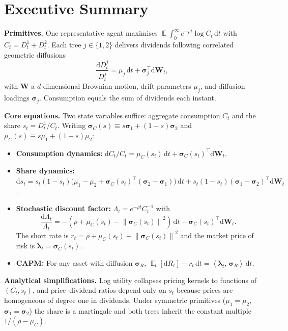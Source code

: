 ﻿\documentclass[11pt,letterpaper,oneside]{article}
\numberwithin{equation}{section}
\DeclareMathOperator{\E}{\mathbb{E}}
\newcommand{\1}{\mathbf{1}}
\newcommand{\diff}{\mathrm{d}}
\newcommand{\norm}[1]{\left\lVert #1\right\rVert}
\newcommand{\ip}[2]{\left\langle #1,\,#2\right\rangle}
\begin{document}
\section*{Executive Summary }
\begin{tcolorbox}[didacticstyle]
\textbf{Primitives.}
One representative agent maximises $\E\!\int_0^\infty e^{-\rho t}\log C_t\,\diff t$ with $C_t=D^1_t+D^2_t$. Each tree $j\in\{1,2\}$ delivers dividends following correlated geometric diffusions
\[
  \frac{\diff D^j_t}{D^j_t}=\mu_j\,\diff t+\bm{\sigma}_j^{\top}\diff \bm{W}_t,
\]
with $\bm{W}$ a $d$-dimensional Brownian motion, drift parameters $\mu_j$, and diffusion loadings $\bm{\sigma}_j$. Consumption equals the sum of dividends each instant.

\textbf{Core equations.} Two state variables suffice: aggregate consumption $C_t$ and the share $s_t=D^1_t/C_t$. Writing $\bm{\sigma}_C(s)\equiv s\bm{\sigma}_1+(1-s)\bm{\sigma}_2$ and $\mu_C(s)\equiv s\mu_1+(1-s)\mu_2$:
\begin{itemize}[leftmargin=1.25em]
  \item \textbf{Consumption dynamics:} $\diff C_t/C_t = \mu_C(s_t)\,\diff t + \bm{\sigma}_C(s_t)^{\top}\diff\bm{W}_t$.
  \item \textbf{Share dynamics:} $\diff s_t = s_t(1-s_t)\big(\mu_1-\mu_2+\bm{\sigma}_C(s_t)^{\top}(\bm{\sigma}_2-\bm{\sigma}_1)\big)\,\diff t + s_t(1-s_t)(\bm{\sigma}_1-\bm{\sigma}_2)^{\top}\diff\bm{W}_t$.
  \item \textbf{Stochastic discount factor:} $\Lambda_t=e^{-\rho t}C_t^{-1}$ with
  \[
    \frac{\diff \Lambda_t}{\Lambda_t}=-(\rho+\mu_C(s_t)-\norm{\bm{\sigma}_C(s_t)}^2)\,\diff t - \bm{\sigma}_C(s_t)^{\top}\diff \bm{W}_t.
  \]
  The short rate is $r_t=\rho+\mu_C(s_t)-\norm{\bm{\sigma}_C(s_t)}^2$ and the market price of risk is $\bm{\lambda}_t=\bm{\sigma}_C(s_t)$.
  \item \textbf{CAPM:} For any asset with diffusion $\bm{\sigma}_R$, $\E_t[\diff R_t]-r_t\,\diff t=\ip{\bm{\lambda}_t}{\bm{\sigma}_R}\,\diff t$.
\end{itemize}
\end{tcolorbox}

\textbf{Analytical simplifications.} Log utility collapses pricing kernels to functions of $(C_t,s_t)$, and price--dividend ratios depend only on $s_t$ because prices are homogeneous of degree one in dividends. Under symmetric primitives ($\mu_1=\mu_2$, $\bm{\sigma}_1=\bm{\sigma}_2$) the share is a martingale and both trees inherit the constant multiple $1/(\rho-\mu_C)$.
\end{document}
